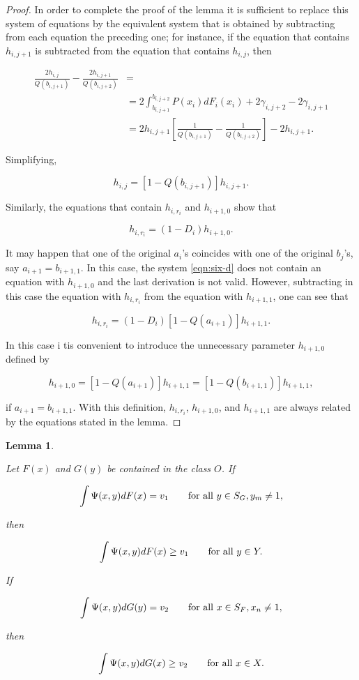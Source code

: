 \documentclass{article}
\newtheorem{lemma}{Lemma}
\theoremstyle{remark}
\begin{document}
\begin{proof}
In order to complete the proof of the lemma it is sufficient to replace this
system of equations by the equivalent system that is obtained by subtracting
from each equation the preceding one; for instance, if the equation that
contains $h_{i, j+1}$ is subtracted from the equation that contains $h_{i,j}$,
then

\[
\begin{aligned}
\frac{2h_{i,j}}{Q(b_{i, j+1})}
- \frac{2h_{i,j+1}}{Q(b_{i, j+2})}
&= \\
&= 2 \int_{b_{i, j+1}}^{b_{i, j+2}} P(x_i)dF_i(x_i) + 2\gamma_{i, j+2} -
2\gamma_{i, j+1} \\
&= 2h_{i, j+1} \left [
    \frac{1}{Q(b_{i, j+1})} - \frac{1}{Q(b_{i, j+2})}
\right ] - 2h_{i, j+1}.
\end{aligned}
\]

Simplifying,

\[
h_{i,j} = [1 - Q(b_{i, j+1})] h_{i, j+1}.
\]

Similarly, the equations that contain $h_{i, r_i}$ and $h_{i+1, 0}$ show that

\[
h_{i, r_i} = (1 - D_i) h_{i+1, 0}.
\]

It may happen that one of the original $a_i$'s coincides with one of the
original $b_j$'s, say $a_{i+1} = b_{i+1, 1}$. In this case, the system
\ref{eqn:six-d} does not contain an equation with $h_{i+1, 0}$ and the last
derivation is not valid. However, subtracting in this case the equation with
$h_{i, r_i}$ from the equation with $h_{i+1, 1}$, one can see that

\[
h_{i, r_i} = (1 - D_i)[1 - Q(a_{i+1})] h_{i+1, 1}.
\]

In this case i tis convenient to introduce the unnecessary parameter $h_{i+1,
0}$ defined by

\[
h_{i+1, 0} = [1 - Q(a_{i+1})]h_{i+1, 1} = [1-Q(b_{i+1, 1})]h_{i+1, 1},
\]

if $a_{i+1} = b_{i+1, 1}$. With this definition, $h_{i, r_i}$, $h_{i+1, 0}$,
and $h_{i+1, 1}$ are always related by the equations stated in the lemma.

\end{proof}


\begin{lemma} \label{lemma:value-of-the-game}

Let $F(x)$ and $G(y)$ be contained in the class $O$. If

\[
\int \Psi(x, y) dF(x) = v_1 \qquad \textup{for all } y \in S_G, y_m \neq 1,
\]

then

\[
\int \Psi(x, y) dF(x) \geq v_1 \qquad \textup{for all } y \in Y.
\]

If

\[
\int \Psi(x, y) dG(y) = v_2 \qquad \textup{for all } x \in S_F, x_n \neq 1,
\]

then

\[
\int \Psi(x, y) dG(x) \geq v_2 \qquad \textup{for all } x \in X.
\]

\end{lemma}
\end{document}
